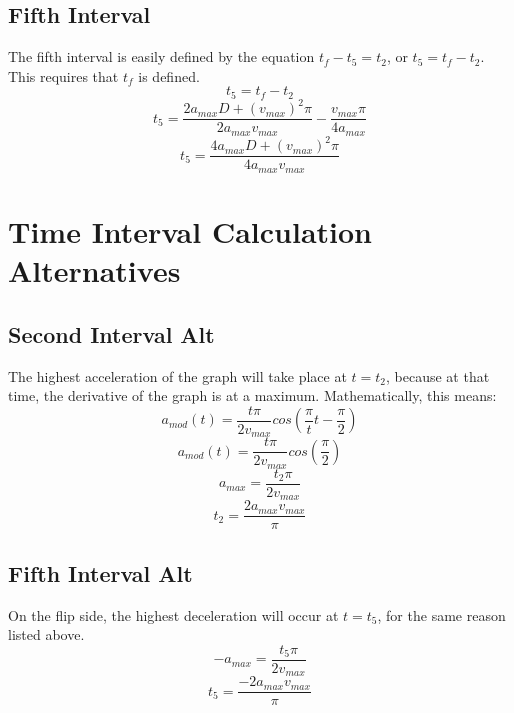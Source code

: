 \documentclass[a4paper,12pt]{report}
\newcommand{\tab}{\hspace{20pt}}
\begin{document}
	\section{Fifth Interval}
	\tab The fifth interval is easily defined by the equation $t_f - t_5 = t_2$, or $t_5 = t_f - t_2$. This requires that $t_f$ is defined.
	\[t_5 = t_f - t_2\]
	\[t_5 = \frac{2a_{max}D + (v_{max})^2\pi}{2a_{max}v_{max}} - \frac{v_{max}\pi}{4a_{max}}\]
	\[t_5 = \frac{4a_{max}D + (v_{max})^2\pi}{4a_{max}v_{max}}\]
	
	\chapter{Time Interval Calculation Alternatives}
	\section{Second Interval Alt}
	\tab The highest acceleration of the graph will take place at $t = t_2$, because at that time, the derivative of the graph is at a maximum. Mathematically, this means:
	\[a_{mod}(t) = \frac{t\pi}{2v_{max}} cos(\frac{\pi}{t}t - \frac{\pi}{2})\]
	\[a_{mod}(t) = \frac{t\pi}{2v_{max}} cos(\frac{\pi}{2})\]
	\[a_{max} = \frac{t_2\pi}{2v_{max}}\]
	\[t_2 = \frac{2a_{max}v_{max}}{\pi}\]
	
	\section{Fifth Interval Alt}
	\tab On the flip side, the highest deceleration will occur at $t = t_5$, for the same reason listed above.
	\[-a_{max} = \frac{t_5\pi}{2v_{max}}\]
	\[t_5 = \frac{-2a_{max}v_{max}}{\pi}\]
	
\end{document}

